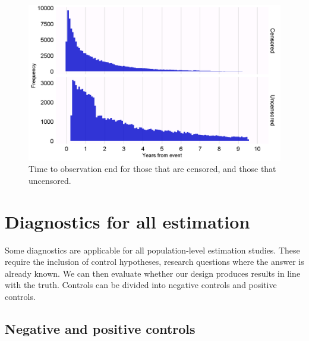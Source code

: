 \documentclass[]{book}
\begin{document}
\begin{figure}

{\centering \includegraphics[width=1\linewidth]{images/MethodValidity/timeToObsEnd} 

}

\caption{Time to observation end for those that are censored, and those that uncensored.}\label{fig:timeToObsEnd}
\end{figure}

\section{Diagnostics for all
estimation}\label{diagnostics-for-all-estimation}

Some diagnostics are applicable for all population-level estimation
studies. These require the inclusion of control hypotheses, research
questions where the answer is already known. We can then evaluate
whether our design produces results in line with the truth. Controls can
be divided into negative controls and positive controls.

\subsection{Negative and positive
controls}\label{negative-and-positive-controls}
\end{document}
